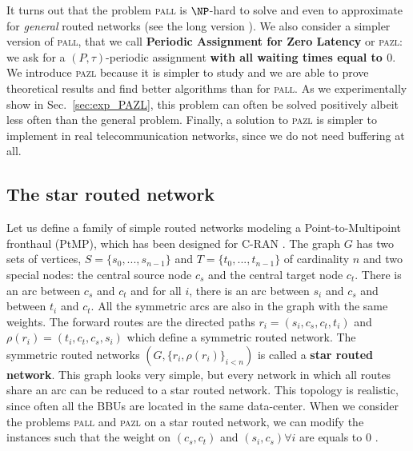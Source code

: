 \documentclass[10pt, conference, letterpaper]{IEEEtran}
\newcommand{\todo}[1]{{\color{red} TODO: {#1}}}
\newcommand\pazl{\textsc{pazl}\xspace}
\newcommand\pall{\textsc{pall}\xspace}
\begin{document}
      It turns out that the problem \pall is $\NP$-hard to solve and even to approximate for \emph{general} routed networks (see the long version \cite{}).      
        We also consider a simpler version of \pall, that we call {\bf Periodic Assignment for Zero Latency} or \pazl: we ask for a $(P,\tau)$-periodic assignment {\bf with all waiting times equal to $0$}. We introduce \pazl because it is simpler to study and we are able to prove theoretical results and find better algorithms than for \pall. As we  experimentally show in Sec.~\ref{sec:exp_PAZL}, this problem can often be solved positively albeit less often than the general problem. Finally, a solution to \pazl is simpler to implement in real telecommunication networks, since we do not need buffering at all. 
       
    
    \subsection{The star routed network}
    
     Let us define a family of simple routed networks modeling a Point-to-Multipoint fronthaul (PtMP), which has been designed for C-RAN \cite{tayq2017real}. 
      The graph $G$ has two sets of vertices, $S=\{s_0,...,s_{n-1}\}$ and $T=\{t_0,...,t_{n-1}\}$ of cardinality $n$ and two special nodes:
      the central source node {\bf $c_s$} and the central target node {\bf $c_t$}.
      There is an arc between {\bf $c_s$} and {\bf $c_t$} and for all $i$, there is an arc between $s_i$ and $c_s$ and between $t_i$ and $c_t$.
      All the symmetric arcs are also in the graph with the same weights.
      The forward routes are the directed paths $r_i = (s_i,c_s,c_t,t_i)$ and $\rho(r_i) = (t_i,c_t,c_s,s_i)$ which define a symmetric routed network. 
      The symmetric routed networks $(G, \{r_i,\rho(r_i)\}_{i<n})$ is called a \textbf{star routed network}. This graph looks very simple, but every network in which all routes share an arc can be reduced to a star routed network. This topology is realistic, since often all the BBUs are located in the same data-center. 
      When we consider the problems \pall and \pazl on a star routed network, we can modify the instances such that the weight on $(c_s,c_t)$ and $(s_i,c_s) \forall i$ are equals to $0$ \cite{versionlongue}.

%      
      
\end{document}
